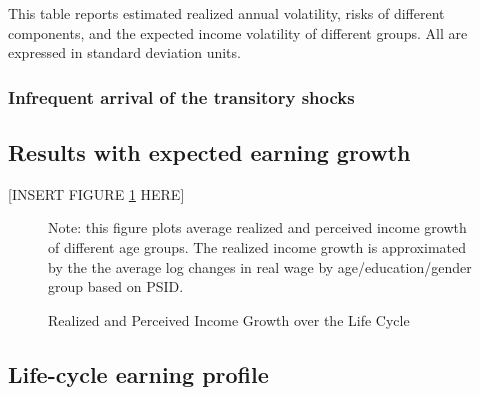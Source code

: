 \begin{table}
{}
	\begin{flushleft} This table reports estimated realized annual volatility, risks of different components, and the expected income volatility of different groups. All are expressed in standard deviation units.\end{flushleft}
\end{table}


\subsubsection{Infrequent arrival of the transitory shocks}

\subsection{Results with expected earning growth}


\begin{center}
[INSERT FIGURE \ref{fig:growth_age_compare} HERE] 
\end{center}


 \begin{figure}[!ht]
    	\caption{Realized and Perceived Income Growth over the Life Cycle}
    	\label{fig:growth_age_compare}
    	\begin{center}
    	\end{center}
    	\begin{flushleft} Note: this figure plots average realized and perceived income growth of different age groups. The realized income growth is approximated by the the average log changes in real wage by age/education/gender group based on PSID.\end{flushleft}
    \end{figure}
    

\subsection{Life-cycle earning profile}
\label{appendix:life-cycle-determinstic}

